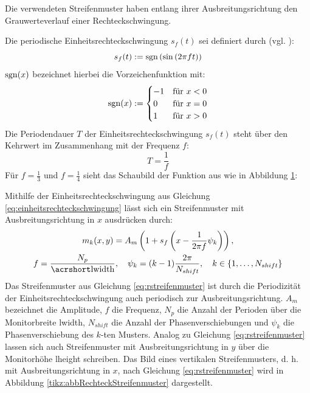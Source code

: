 Die verwendeten Streifenmuster haben entlang ihrer Ausbreitungsrichtung den Grauwerteverlauf einer Rechteckschwingung.

\noindent
Die periodische Einheitsrechteckschwingung $s_f(t)$ sei definiert durch (vgl. \cite{squareWave}):
%
\begin{equation} \label{eq:einheitsrechteckschwingung}
	s_f(t) := \operatorname{sgn} \left( \sin \left(2 \pi f t \right) \right)
\end{equation}
%
$\operatorname{sgn}(x)$ bezeichnet hierbei die Vorzeichenfunktion mit:
%
\begin{equation*}
	\operatorname{sgn}(x) := 
		\begin{cases}
	      -1 & \text{für $x < 0$}\\
	      0 & \text{für $x = 0$}\\
	      1 & \text{für $x > 0$}
	    \end{cases} 
\end{equation*}
%
Die Periodendauer $T$ der Einheitsrechteckschwingung $s_f(t)$ steht über den Kehrwert im Zusammenhang mit der Frequenz $f$:
\begin{equation*}
	T = \dfrac{1}{f}
\end{equation*}
Für $f = \tfrac{1}{3}$ und $f = \tfrac{1}{4}$ sieht das Schaubild der Funktion aus wie in Abbildung \ref{tikz:abbRechteckschwingung}:
{
	\begin{figure}[H]
		\centering
		
		\label{tikz:abbRechteckschwingung}
	\end{figure}
}

\noindent
Mithilfe der Einheitsrechteckschwingung aus Gleichung \ref{eq:einheitsrechteckschwingung} lässt sich ein Streifenmuster mit Ausbreitungsrichtung in $x$ ausdrücken durch:
\begin{equation} \label{eq:rstreifenmuster}
	\begin{gathered}
		m_k(x,y) = A_m 
		\left(
			1 + s_f \left(x - \dfrac{1}{2\pi f} \psi_k \right)
		\right),\\
		f = \dfrac{N_p}{\acrshortmath{lwidth}},
		\quad
		\psi_k = (k - 1)\dfrac{2\pi}{N_{shift}},
		\quad
		k \in \lbrace 1,\ldots,N_{shift}\rbrace 
	\end{gathered}
\end{equation}
%
Das Streifenmuster aus Gleichung \ref{eq:rstreifenmuster} ist durch die Periodizität der Einheitsrechteckschwingung auch periodisch zur Ausbreitungsrichtung.
$A_m$ bezeichnet die Amplitude, $f$ die Frequenz, $N_p$ die Anzahl der Perioden über die Monitorbreite \acrshort{lwidth}, $N_{shift}$ die Anzahl der Phasenverschiebungen und $\psi_k$ die Phasenverschiebung des $k$-ten Musters.
Analog zu Gleichung \ref{eq:rstreifenmuster} lassen sich auch Streifenmuster mit Ausbreitungsrichtung in $y$ über die Monitorhöhe \acrshort{lheight} schreiben.
Das Bild eines vertikalen Streifenmusters, d. h. mit Ausbreitungsrichtung in $x$, nach Gleichung \ref{eq:rstreifenmuster} wird in Abbildung \ref{tikz:abbRechteckStreifenmuster} dargestellt.

